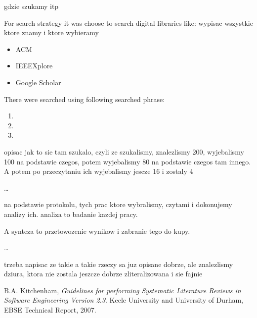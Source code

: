 \documentclass[times, 10pt,twocolumn]{article}
\begin{document}

gdzie szukamy itp

For search strategy it was choose to search digital libraries like:
wypisac wszystkie ktore znamy i ktore wybieramy
\begin{itemize}
	\item ACM
	\item IEEEXplore
	\item Google Scholar
\end{itemize}

There were searched using following searched phrase:
\begin{enumerate}
	\item 
	\item
	\item
\end{enumerate}



opisac jak to sie tam szukalo, czyli ze szukalismy, znalezlismy 200,
wyjebalismy 100 na podstawie czegos, potem wyjebalismy 80 na podstawie 
czegos tam innego. A potem po przeczytaniu ich wyjebalismy jescze 16 i zostaly
4

\ldots



na podstawie protokolu, tych prac ktore wybralismy, czytami i dokonujemy analizy ich.
analiza to badanie kazdej pracy.


A synteza to przetowozenie wynikow i zabranie tego do kupy.

\ldots


trzeba napisac ze takie a takie rzeczy sa juz opisane dobrze, ale znalezlismy dziura, ktora
nie zostala jeszcze dobrze zliteralizowana i sie fajnie

\begin{thebibliography}{9}

  B.A. Kitchenham,
  \emph{Guidelines for performing Systematic Literature Reviews in Software Engineering Version 2.3}.
  Keele University and University of Durham,
  EBSE Technical Report,
  2007.

\end{thebibliography}
\end{document}
